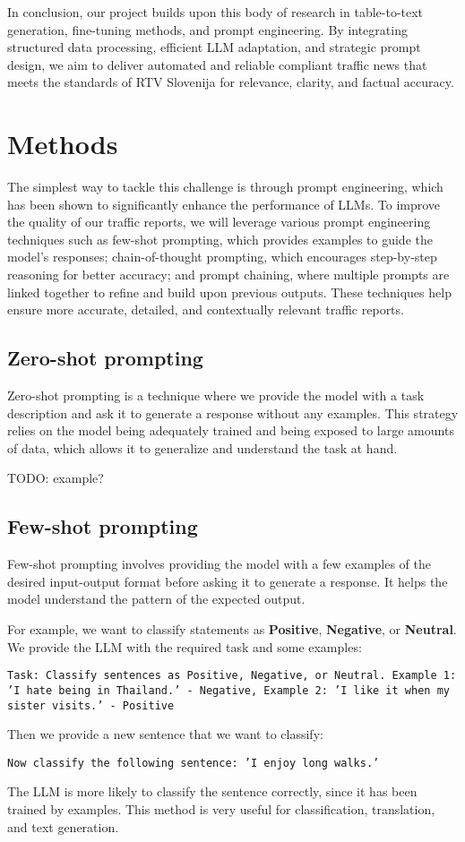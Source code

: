 \documentclass[fleqn,moreauthors,10pt]{ds_report}
\begin{document}
In conclusion, our project builds upon this body of research in table-to-text generation, fine-tuning methods, and prompt engineering. By integrating structured data processing, efficient LLM adaptation, and strategic prompt design, we aim to deliver automated and reliable compliant traffic news that meets the standards of RTV Slovenija for relevance, clarity, and factual accuracy.

\section*{Methods}
The simplest way to tackle this challenge is through prompt engineering, which has been shown to significantly enhance the performance of LLMs.
To improve the quality of our traffic reports, we will leverage various prompt engineering techniques such as few-shot prompting, which provides examples to guide the model’s responses; chain-of-thought prompting, which encourages step-by-step reasoning for better accuracy; and prompt chaining, where multiple prompts are linked together to refine and build upon previous outputs.
These techniques help ensure more accurate, detailed, and contextually relevant traffic reports.

\subsection{Zero-shot prompting}
Zero-shot prompting is a technique where we provide the model with a task description and ask it to generate a response without any examples.
This strategy relies on the model being adequately trained and being exposed to large amounts of data, which allows it to generalize and understand the task at hand.

TODO: example?


\subsection*{Few-shot prompting}
Few-shot prompting involves providing the model with a few examples of the desired input-output format before asking it to generate a response.
It helps the model understand the pattern of the expected output.

For example, we want to classify statements as \textbf{Positive}, \textbf{Negative}, or \textbf{Neutral}.
We provide the LLM with the required task and some examples:
\begin{center}
    \texttt{Task: Classify sentences as Positive, Negative, or Neutral.\newline
    Example 1: 'I hate being in Thailand.' - Negative,\newline
    Example 2: 'I like it when my sister visits.' - Positive}
\end{center}
Then we provide a new sentence that we want to classify:
\begin{center}
    \texttt{Now classify the following sentence: 'I enjoy long walks.'}
\end{center}
The LLM is more likely to classify the sentence correctly, since it has been trained by examples.
This method is very useful for classification, translation, and text generation.
\end{document}
